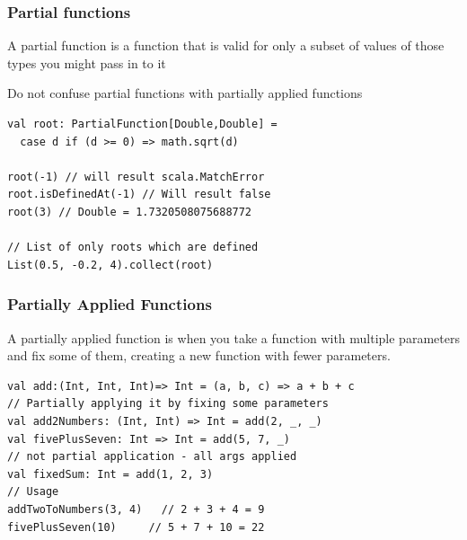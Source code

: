 \documentclass{beamer}
\begin{document}
\begin{frame}[fragile]
\frametitle{Partial functions}

A partial function is a function that is valid for only a subset of values of those types you might pass in to it


Do not confuse partial functions with partially applied functions
\begin{lstlisting}[style=scalaStyle]
val root: PartialFunction[Double,Double] = 
  case d if (d >= 0) => math.sqrt(d)

root(-1) // will result scala.MatchError
root.isDefinedAt(-1) // Will result false
root(3) // Double = 1.7320508075688772 

// List of only roots which are defined
List(0.5, -0.2, 4).collect(root) 

\end{lstlisting}
\end{frame}

\begin{frame}[fragile]
\frametitle{Partially Applied Functions}

A partially applied function is when you take a function with multiple parameters and fix some of them, creating a new function with fewer parameters.

\begin{lstlisting}[style=scalaStyle]
val add:(Int, Int, Int)=> Int = (a, b, c) => a + b + c 
// Partially applying it by fixing some parameters
val add2Numbers: (Int, Int) => Int = add(2, _, _)
val fivePlusSeven: Int => Int = add(5, 7, _)
// not partial application - all args applied
val fixedSum: Int = add(1, 2, 3) 
// Usage
addTwoToNumbers(3, 4)   // 2 + 3 + 4 = 9
fivePlusSeven(10)     // 5 + 7 + 10 = 22

\end{lstlisting}
\end{frame}
\end{document}
